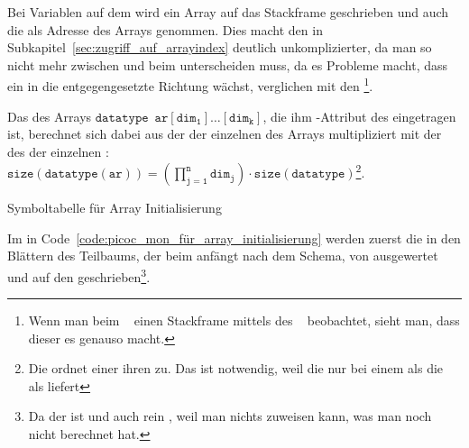 Bei Variablen auf dem  wird ein Array  auf das Stackframe geschrieben und auch die  als Adresse des Arrays genommen. Dies macht den  in Subkapitel~\ref{sec:zugriff_auf_arrayindex} deutlich unkomplizierter, da man so nicht mehr zwischen  und  beim  unterscheiden muss, da es Probleme macht, dass ein  in die entgegengesetzte Richtung wächst, verglichen mit den \footnote{Wenn man beim ~\cite{noauthor_gcc_nodate} einen Stackframe mittels des ~\cite{noauthor_gcc_nodate} beobachtet, sieht man, dass dieser es genauso macht.}.

\begin{Special_Paragraph}
  Das  des Arrays $\mathtt{datatype \enspace ar[dim_1]\ldots[dim_k]}$, die ihm -Attribut des  eingetragen ist, berechnet sich dabei aus der  der einzelnen  des Arrays multipliziert mit der  des  der einzelnen : $\mathtt{size(datatype(ar)) = \left(\prod^n_{j=1} dim_j\right)\cdot size(datatype)}$\footnote{Die    ordnet einer   ihren  zu. Das ist notwendig, weil die   nur bei einem  als  die  als  liefert}.
\end{Special_Paragraph}

\begin{code}
  \centering
  \caption{Symboltabelle für Array Initialisierung}
  \label{code:symboltabelle_für_array_initialisierung}
\end{code}

Im  in Code~\ref{code:picoc_mon_für_array_initialisierung} werden zuerst die  in den Blättern des Teilbaums, der beim    anfängt nach dem  Schema, von  ausgewertet und auf den  geschrieben\footnote{Da der  \smalltt{=}  ist und auch rein , weil man nichts zuweisen kann, was man noch nicht berechnet hat.}.

